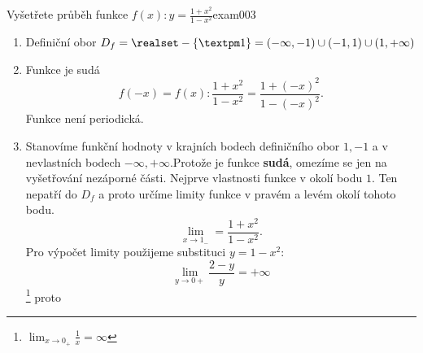 \begin{mathexam}{Vyšetřete průběh funkce \(f(x):y=\frac{1+x^2}{1-x^2}\)}{exam003}
  \begin{enumerate}[noitemsep]
    \item Definiční obor $D_f=\realset-\{±1\}=(-\infty,-1)\cup(-1,1)\cup(1,+\infty)$
    \item Funkce je sudá $$f(-x)=f(x): \frac{1+x^2}{1-x^2}=\frac{1+(-x)^2}{1-(-x)^2}.$$ Funkce není
        periodická.
    \item Stanovíme funkční hodnoty v krajních bodech definičního obor $1, -1$ a v nevlastních
        bodech $-\infty,+\infty$.Protože je funkce \textbf{sudá}, omezíme se jen na vyšetřování
        nezáporné části. Nejprve vlastnosti funkce v okolí bodu $1$. Ten nepatří do $D_f$ a proto
        určíme limity funkce v pravém a levém okolí tohoto bodu. $$\lim_{x\to
        1_{-}}=\frac{1+x^2}{1-x^2}.$$ Pro výpočet limity použijeme substituci $y=1-x^2$: 
        $$\lim_{y\to0+}\frac{2-y}{y}=+\infty$$ \footnote{$\lim_{x\to0_+}\frac{1}{x}=\infty$} proto
        

\end{enumerate}
\end{mathexam}
